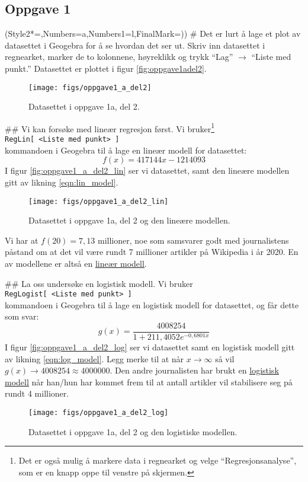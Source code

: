 \documentclass[12pt, a4paper]
{article}						%
\def\answer#1{\underline{\underline{#1}}}
\newcommand{\figwidth}{0.75}
\begin{document}
\subsection*{Oppgave 1}
\begin{easylist}[enumerate]
	\ListProperties(Style2*=,Numbers=a,Numbers1=l,FinalMark={)})
	# Det er lurt å lage et plot av datasettet i Geogebra for å se hvordan det ser ut. Skriv inn datasettet i regnearket, marker de to kolonnene,  høyreklikk og trykk ``Lag'' $\rightarrow$ ``Liste med punkt.'' Datasettet er plottet i figur \eqref{fig:oppgave1adel2}.
	\begin{figure}[th!]
		\centering
		\texttt{[image: figs/oppgave1\_a\_del2]}
		\caption{Datasettet i oppgave 1a, del 2.}
		\label{fig:oppgave1adel2}
	\end{figure}
	## Vi kan forsøke med lineær regresjon først. 
	Vi bruker\footnote{Det er også mulig å markere data i regnearket og velge ``Regresjonsanalyse'', som er en knapp oppe til venstre på skjermen.} \\
	\texttt{RegLin[ <Liste med punkt> ]} \\
	kommandoen i Geogebra til å lage en lineær modell for datasettet:
	\begin{equation}
	\label{eqn:lin_model}
		f(x) = 417144x - 1214093
	\end{equation}
	I figur \eqref{fig:oppgave1_a_del2_lin} ser vi datasettet, samt den lineære modellen gitt av likning \eqref{eqn:lin_model}.
	\begin{figure}[th!]
		\centering
		\texttt{[image: figs/oppgave1\_a\_del2\_lin]}
		\caption{Datasettet i oppgave 1a, del 2 og den lineære modellen.}
		\label{fig:oppgave1_a_del2_lin}
	\end{figure}
	Vi har at $f(20) = 7,13$ millioner, noe som samsvarer godt med journalistens påstand om at det vil være rundt 7 millioner artikler på Wikipedia i år 2020. En av modellene er altså en \answer{lineær modell}.

	## La oss undersøke en logistisk modell. 
	Vi bruker \\
	\texttt{RegLogist[ <Liste med punkt> ]} \\
	kommandoen i Geogebra til å lage en logistisk modell for datasettet, og får dette som svar:
	\begin{equation}
	\label{eqn:log_model}
	g(x) = \frac{4008254}{1 + 211,4052e^{-0,6801x}}
	\end{equation}
	I figur \eqref{fig:oppgave1_a_del2_log} ser vi datasettet samt en logistisk modell gitt av likning \eqref{eqn:log_model}.
	Legg merke til at når $x \to \infty$ så vil $g(x) \to 4008254 \approx 4000000$. 
	Den andre journalisten har brukt en \answer{logistisk modell} når han/hun har kommet frem til at antall artikler vil stabilisere seg på rundt 4 millioner.
	\begin{figure}[th!]
		\centering
		\texttt{[image: figs/oppgave1\_a\_del2\_log]}
		\caption{Datasettet i oppgave 1a, del 2 og den logistiske modellen.}
		\label{fig:oppgave1_a_del2_log}
	\end{figure}
	

\end{easylist}
\end{document}
